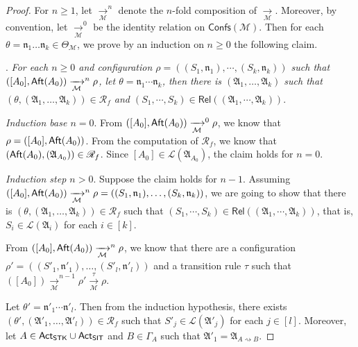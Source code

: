 \documentclass[preprint,12pt]{elsarticle}
\newcommand\Mm{{\mathcal{M} }}
\newcommand\act{{\sf Act}}
\newcommand\aft{{\sf Aft}}
\newcommand\singletask{{\sf STK}}
\newcommand\singleinstance{{\sf SIT}}
\newcommand\confs{{\mathsf{Confs} }}
\newcommand\aname{\mathfrak{n}}
\newcommand\AutReach{\mathscr{R}}
\newcommand\Rel{\mathsf{Rel}}
\newcommand\Aut{{\mathfrak{A} }}
\newcommand\Lang{{\mathscr{L} }}
\newcommand\ConfSet{{\mathscr{C} }}
\begin{document}
\begin{proof}
For $n \ge 1$, let $\xrightarrow[\Mm]{}^n$ denote the $n$-fold composition of $\xrightarrow[\Mm]{}$. Moreover, by convention, let $\xrightarrow[\Mm]{}^0$ be the identity relation on $\confs(\Mm)$. 
Then for each $\theta = \aname_1 \dots \aname_k \in \Theta_\Mm$, we prove by an induction on $n \ge 0$ the following claim.

\smallskip

. \emph{For each $n \ge 0$ and configuration $\rho =  ((S_1, \aname_1), \cdots, (S_k, \aname_k))$ such that 
%
$([A_0], \aft(A_0)) \xrightarrow[\Mm]{}^n \rho$,  let $\theta  = \aname_1 \cdots \aname_k$, then 
%
there is  $(\Aut_1, \dots, \Aut_k)$ such that $(\theta, (\Aut_1, \dots, \Aut_k)) \in \AutReach_f$ and $(S_1, \cdots, S_k) \in \Rel((\Aut_1,\cdots, \Aut_k))$}.   


\smallskip

\noindent \emph{Induction base $n = 0$}. From $([A_0], \aft(A_0)) \xrightarrow[\Mm]{}^0 \rho$, we know that $\rho = ([A_0], \aft(A_0))$. From the computation of $\AutReach_f$, we know that $(\aft(A_0), (\Aut_{A_0})) \in \AutReach_f$. Since $[A_0] \in \Lang(\Aut_{A_0})$, the claim holds for $n = 0$. 

\smallskip

\noindent \emph{Induction step $n > 0$}. Suppose the claim holds for $n-1$. Assuming $([A_0], \aft(A_0)) \xrightarrow[\Mm]{}^n \rho =  ((S_1, \aname_1), \dots, (S_k, \aname_k))$, we are going to show that there is  $(\theta, (\Aut_1, \dots, \Aut_k)) \in \AutReach_f$ such that $(S_1, \cdots, S_k) \in \Rel((\Aut_1,\cdots, \Aut_k))$, that is, $S_i \in \Lang(\Aut_i)$ for each $i \in [k]$. 

From $([A_0], \aft(A_0)) \xrightarrow[\Mm]{}^n \rho$,  we know that there are a configuration $\rho' = ((S'_1, \aname'_1), \dots, (S'_l, \aname'_l))$ and a transition rule $\tau$ such that $([A_0]) \xrightarrow[\Mm]{}^{n-1} \rho' \xrightarrow[\Mm]{\tau} \rho$.

Let $\theta'= \aname'_1 \cdots \aname'_l$. Then from the induction hypothesis, there exists $(\theta', (\Aut'_1, \dots, \Aut'_l)) \in \AutReach_f$ such that $S'_j \in \Lang(\Aut'_j)$ for each $j \in [l]$. Moreover, let $A \in \act_\singletask\cup\act_\singleinstance$ and $B \in \Gamma_A$ such that $\Aut'_1 = \Aut_{A \rightsquigarrow B}$. 


\end{proof}
\end{document}
